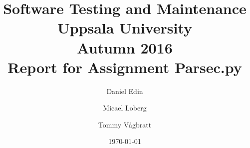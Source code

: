 
\title{\textbf{Software Testing and Maintenance\\
    Uppsala University \\ Autumn 2016 \\
    Report for Assignment Parsec.py}}


\author{ Daniel Edin \and Micael Loberg \and Tommy Vågbratt }

\date{\today}
